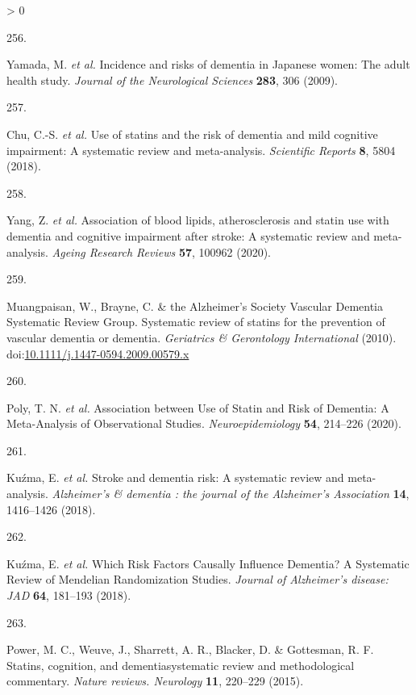\documentclass[a4paper, twoside]{templates/ociamthesis}
\newlength{\cslhangindent}
\newlength{\csllabelwidth}
\newenvironment{CSLReferences}[3] %
 {%
  \setlength{\parindent}{0pt}
  \ifodd #1 \everypar{\setlength{\hangindent}{\cslhangindent}}\ignorespaces\fi
  \ifnum #2 > 0
  \setlength{\parskip}{#2\baselineskip}
  \fi
 }%
 {}
\newcommand{\CSLLeftMargin}[1]{\parbox[t]{\maxof{\widthof{#1}}{\csllabelwidth}}{#1}}
\newcommand{\CSLRightInline}[1]{\parbox[t]{\linewidth - \csllabelwidth}{#1}}
\begin{document}
\begin{CSLReferences}{0}{0}
\leavevmode\hypertarget{ref-yamada2009conf}{}%
\CSLLeftMargin{256. }
\CSLRightInline{Yamada, M. \emph{et al.} Incidence and risks of dementia in {Japanese} women: The adult health study. \emph{Journal of the Neurological Sciences} \textbf{283}, 306 (2009).}

\leavevmode\hypertarget{ref-chu2018}{}%
\CSLLeftMargin{257. }
\CSLRightInline{Chu, C.-S. \emph{et al.} Use of statins and the risk of dementia and mild cognitive impairment: A systematic review and meta-analysis. \emph{Scientific Reports} \textbf{8}, 5804 (2018).}

\leavevmode\hypertarget{ref-yang2020}{}%
\CSLLeftMargin{258. }
\CSLRightInline{Yang, Z. \emph{et al.} Association of blood lipids, atherosclerosis and statin use with dementia and cognitive impairment after stroke: A systematic review and meta-analysis. \emph{Ageing Research Reviews} \textbf{57}, 100962 (2020).}

\leavevmode\hypertarget{ref-muangpaisan2010}{}%
\CSLLeftMargin{259. }
\CSLRightInline{Muangpaisan, W., Brayne, C. \& the Alzheimer's Society Vascular Dementia Systematic Review Group. Systematic review of statins for the prevention of vascular dementia or dementia. \emph{Geriatrics \& Gerontology International} (2010). doi:\href{https://doi.org/10.1111/j.1447-0594.2009.00579.x}{10.1111/j.1447-0594.2009.00579.x}}

\leavevmode\hypertarget{ref-poly2020}{}%
\CSLLeftMargin{260. }
\CSLRightInline{Poly, T. N. \emph{et al.} Association between {Use} of {Statin} and {Risk} of {Dementia}: A {Meta}-{Analysis} of {Observational Studies}. \emph{Neuroepidemiology} \textbf{54}, 214--226 (2020).}

\leavevmode\hypertarget{ref-kuzma2018stroke}{}%
\CSLLeftMargin{261. }
\CSLRightInline{Kuźma, E. \emph{et al.} Stroke and dementia risk: A systematic review and meta-analysis. \emph{Alzheimer's \& dementia : the journal of the Alzheimer's Association} \textbf{14}, 1416--1426 (2018).}

\leavevmode\hypertarget{ref-kuzma2018risk}{}%
\CSLLeftMargin{262. }
\CSLRightInline{Kuźma, E. \emph{et al.} Which {Risk Factors Causally Influence Dementia}? A {Systematic Review} of {Mendelian Randomization Studies}. \emph{Journal of Alzheimer's disease: JAD} \textbf{64}, 181--193 (2018).}

\leavevmode\hypertarget{ref-power2015}{}%
\CSLLeftMargin{263. }
\CSLRightInline{Power, M. C., Weuve, J., Sharrett, A. R., Blacker, D. \& Gottesman, R. F. Statins, cognition, and dementia{}systematic review and methodological commentary. \emph{Nature reviews. Neurology} \textbf{11}, 220--229 (2015).}


\end{CSLReferences}
\end{document}
